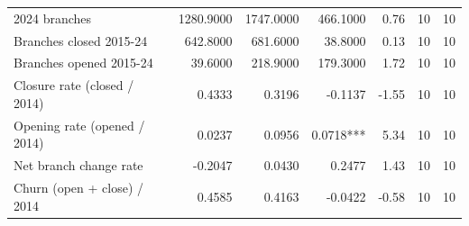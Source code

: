 \begin{tabular}{lrrrrrr}
2024 branches & 1280.9000 & 1747.0000 & 466.1000 & 0.76 & 10 & 10 \\
Branches closed 2015-24 & 642.8000 & 681.6000 & 38.8000 & 0.13 & 10 & 10 \\
Branches opened 2015-24 & 39.6000 & 218.9000 & 179.3000 & 1.72 & 10 & 10 \\
Closure rate (closed / 2014) & 0.4333 & 0.3196 & -0.1137 & -1.55 & 10 & 10 \\
Opening rate (opened / 2014) & 0.0237 & 0.0956 & 0.0718*** & 5.34 & 10 & 10 \\
Net branch change rate & -0.2047 & 0.0430 & 0.2477 & 1.43 & 10 & 10 \\
Churn (open + close) / 2014 & 0.4585 & 0.4163 & -0.0422 & -0.58 & 10 & 10 \\
\bottomrule
\end{tabular}

